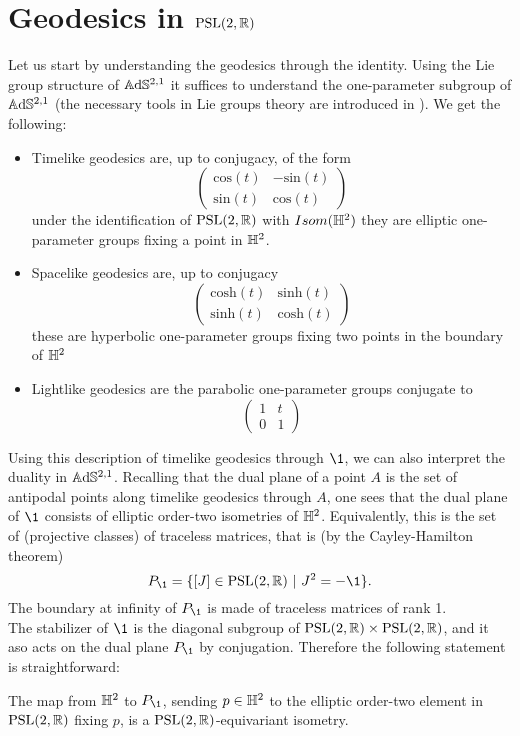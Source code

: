 \section{Geodesics in $\text{PSL}(2,\mathbb{R})$}
Let us start by understanding the geodesics through the identity. Using the Lie group structure of $\mathbb{A}\mathrm{d}\mathbb{S}^{2,1}$ it suffices to understand the one-parameter subgroup of $\mathbb{A}\mathrm{d}\mathbb{S}^{2,1}$
(the necessary tools in Lie groups theory are introduced in \cite{bonsanteseppi}). We get the following:
\begin{itemize}
    \item Timelike geodesics are, up to conjugacy, of the form
    \[ \begin{pmatrix}
        \text{cos}(t) & -\text{sin}(t) \\
        \text{sin}(t) & \text{cos}(t)
    \end{pmatrix} \]
    under the identification of $\text{PSL}(2,\mathbb{R})$ with $Isom(\mathbb{H}^2)$ they are elliptic one-parameter groups fixing a point in $\mathbb{H}^2$.
    \item Spacelike geodesics are, up to conjugacy
    \[ \begin{pmatrix}
        \text{cosh}(t) & \text{sinh}(t) \\
        \text{sinh}(t) & \text{cosh}(t)
    \end{pmatrix} \]
    these are hyperbolic one-parameter groups fixing two points in the boundary of $\mathbb{H}^2$
    \item Lightlike geodesics are the parabolic one-parameter groups conjugate to
    \[ \begin{pmatrix}
        1 & t \\
        0 & 1
    \end{pmatrix} \]
\end{itemize}
Using this description of timelike geodesics through $\1$, we can also interpret the duality in $\mathbb{A}\mathrm{d}\mathbb{S}^{2,1}$. Recalling that the dual plane of a point $A$ is the set of antipodal points along timelike geodesics through $A$, one sees that the dual plane of $\1$ consists of elliptic order-two isometries of $\mathbb{H}^2$. Equivalently, this is the set of (projective classes) of traceless matrices, that is (by the Cayley-Hamilton theorem)
\[
    P_\1 = \{ [J]\in\PSL \ | \ J^2 = -\1 \}.
\]
The boundary at infinity of $P_\1$ is made of traceless matrices of rank 1.\\
The stabilizer of $\1$ is the diagonal subgroup of $\text{PSL}(2,\mathbb{R}) \times \text{PSL}(2,\mathbb{R})$, and it aso acts on the dual plane $P_\1$ by conjugation. Therefore the following statement is straightforward:
\begin{lemma}\label{lem:dual plane}
    The map from $\mathbb{H}^2$ to $P_\1$, sending $p\in\mathbb{H}^2$ to the elliptic order-two element in $\text{PSL}(2,\mathbb{R})$ fixing $p$, is a $\text{PSL}(2,\mathbb{R})$-equivariant isometry.
\end{lemma}

